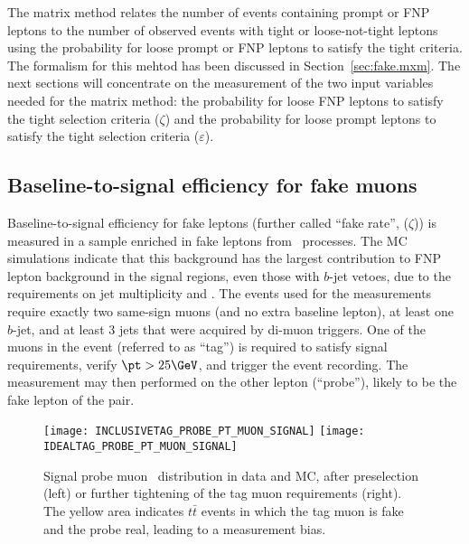 The matrix method relates the number of events containing prompt or FNP leptons 
to the number of observed events with tight or loose-not-tight leptons 
using the probability for loose prompt or FNP leptons to satisfy the tight criteria.
The formalism for this mehtod has been discussed in Section~\ref{sec:fake.mxm}.
The next sections will concentrate on the measurement of the 
two input variables needed for the matrix method:
the probability for loose FNP leptons to satisfy the tight selection
criteria ($\zeta$) and 
the probability for loose prompt leptons to satisfy the tight selection 
criteria ($\varepsilon$).

\subsection*{Baseline-to-signal efficiency for fake muons}

Baseline-to-signal efficiency for fake leptons (further called ``fake rate'', ($\zeta$)) is measured 
in a sample enriched in fake leptons from \ttbar\ processes.
The MC simulations indicate that this background has the largest contribution to FNP lepton background in the signal regions, 
even those with $b$-jet vetoes, due to the requirements on jet multiplicity and \met. 
The events used for the measurements require exactly two same-sign muons (and no extra baseline lepton), 
at least one $b$-jet, and at least 3 jets that were acquired by di-muon triggers.
One of the muons in the event (referred to as ``tag'') is required to satisfy signal requirements, verify $\pt>25 \GeV$, 
and trigger the event recording. 
The measurement may then performed on the other lepton (``probe''), likely to be the fake lepton of the pair. 

\begin{figure}[t!]
\centering
\texttt{[image: INCLUSIVETAG\_PROBE\_PT\_MUON\_SIGNAL]}
\texttt{[image: IDEALTAG\_PROBE\_PT\_MUON\_SIGNAL]}
\caption
{Signal probe muon \pt\ distribution in data and MC, after preselection (left) 
or further tightening of the tag muon requirements (right).
The yellow area indicates $t\bar t$ events in which the tag muon is fake and the probe real, 
leading to a measurement bias. 
}
\label{Fig:fakes_preselection_muon}
\end{figure}

